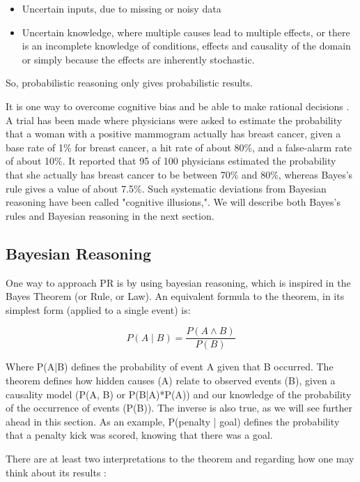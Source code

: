 \begin{itemize}
  \item Uncertain inputs, due to missing or noisy data
  \item Uncertain knowledge, where multiple causes lead to multiple effects,
  or there is an incomplete knowledge of conditions, effects and causality of the
  domain or simply because the effects are inherently stochastic.
\end{itemize}

So, probabilistic reasoning only gives probabilistic results.

It is one way to
overcome cognitive bias and be able to make rational decisions \cite{Sedlmeier2001}.
A trial has been made \cite{christensen1982experience}
where physicians were asked to estimate the probability that a
woman with a positive mammogram actually has breast cancer, given a base rate of
1\% for breast cancer, a hit rate of about 80\%, and a false-alarm rate of about
10\%. It reported that 95 of 100 physicians estimated the probability that she
actually has breast cancer to be between 70\% and 80\%, whereas Bayes's rule
gives a value of about 7.5\%. Such systematic deviations from Bayesian reasoning
have been called "cognitive illusions,". We will describe both Bayes's rules
and Bayesian reasoning in the next section.

\subsection{Bayesian Reasoning}
\label{sec:bayes}

One way to approach PR is by using bayesian reasoning, which is inspired in the
Bayes Theorem (or Rule, or Law). An equivalent formula to the theorem, in its
simplest form (applied to a single event) is:

$$ P(A \mid B) = \frac{P(A \land B)}{P(B)} $$

Where P(A|B) defines the probability of event A given that B occurred.
The theorem defines how hidden causes (A) relate to observed events (B), given
a causality model (P(A, B) or P(B|A)*P(A)) and our knowledge of the probability of the
occurrence of events (P(B)). The inverse is also true, as we will see further
ahead in this section.
As an example, P(penalty | goal) defines the probability that a penalty kick was
scored, knowing that there was a goal.

There are at least two interpretations to the theorem and regarding how one may think
about its results \cite{Fienberg2006}:

